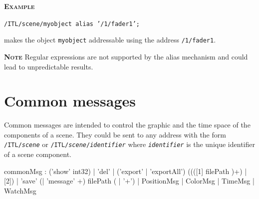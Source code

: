 \documentclass[a4paper,twoside]{report}
\newcommand{\toplevel}[1]	{\chapter{#1}}
\newcommand{\OSC}[1]		{\texttt{#1}}
\newcommand{\example}		{\textbf{\hspace{-1.5cm}\textbf{\textsc{Example }}}}
\newcommand{\note}	[1]		{\vspace{2mm}\textbf{\hspace{-1.03cm}\textbf{\textsc{Note #1}}}}
\newcommand{\sample}	[1]			{\vspace{-2mm}\begin{center}\colorbox{mygrey}{
								\begin{minipage}[t]{0.9\columnwidth} 
								{\small \texttt{#1}}
								\end{minipage}}\end{center}}
\newcommand{\sampleindent}	{ \hspace{0.5cm} }
\begin{document}
\example
\sample{/ITL/scene/myobject alias '/1/fader1';}
\sampleindent makes the object \OSC{myobject} addressable using the address \OSC{/1/fader1}.

\note{} Regular expressions are not supported by the alias mechanism and could lead to unpredictable results.



\toplevel{Common messages}
\label{common}
Common messages are intended to control the graphic and the time space of the components of a scene.
They could be sent to any address with the form \OSC{/ITL/\textit{scene}} or \OSC{/ITL/\textit{scene}/\textit{identifier}} where \OSC{\textit{identifier}} is the unique identifier of a scene component.
\begin{rail}
commonMsg :  ('show' int32)
			| 'del'
			| ('export' | 'exportAll') ((([1] filePath )+) | [2])
			| 'save' (| 'message' +) filePath ( | '+')
			| PositionMsg
			| ColorMsg
			| TimeMsg
			| WatchMsg
\end{rail}
\end{document}
